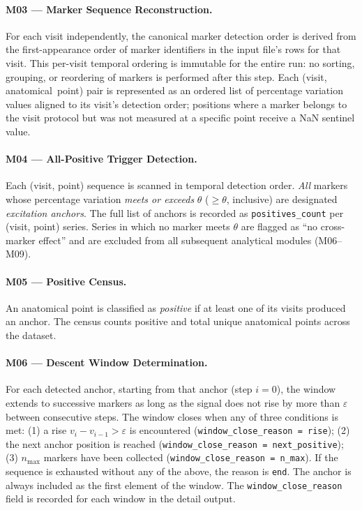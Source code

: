 \documentclass[a4paper,11pt]{article}
\begin{document}
\paragraph{M03 --- Marker Sequence Reconstruction.}
For each visit independently, the canonical marker detection order is derived from the
first-appearance order of marker identifiers in the input file's rows for that visit.
This per-visit temporal ordering is immutable for the entire run: no sorting, grouping, or
reordering of markers is performed after this step.
Each (visit, anatomical~point) pair is represented as an ordered list of percentage
variation values aligned to its visit's detection order; positions where a marker belongs
to the visit protocol but was not measured at a specific point receive a NaN sentinel value.

\paragraph{M04 --- All-Positive Trigger Detection.}
Each (visit, point) sequence is scanned in temporal detection order.
\emph{All} markers whose percentage variation \emph{meets or exceeds} $\theta$
($\geq \theta$, inclusive) are designated \emph{excitation anchors}.
The full list of anchors is recorded as \texttt{positives\_count} per (visit, point) series.
Series in which no marker meets $\theta$ are flagged as ``no cross-marker effect'' and
are excluded from all subsequent analytical modules (M06--M09).

\paragraph{M05 --- Positive Census.}
An anatomical point is classified as \emph{positive} if at least one of its visits produced
an anchor. The census counts positive and total unique anatomical points across the dataset.

\paragraph{M06 --- Descent Window Determination.}
For each detected anchor, starting from that anchor (step $i = 0$), the window extends
to successive markers as long as the signal does not rise by more than $\varepsilon$
between consecutive steps.
The window closes when any of three conditions is met: (1) a rise
$v_i - v_{i-1} > \varepsilon$ is encountered (\texttt{window\_close\_reason = rise});
(2) the next anchor position is reached (\texttt{window\_close\_reason = next\_positive});
(3) $n_{\max}$ markers have been collected (\texttt{window\_close\_reason = n\_max}).
If the sequence is exhausted without any of the above, the reason is \texttt{end}.
The anchor is always included as the first element of the window.
The \texttt{window\_close\_reason} field is recorded for each window in the detail output.
\end{document}
